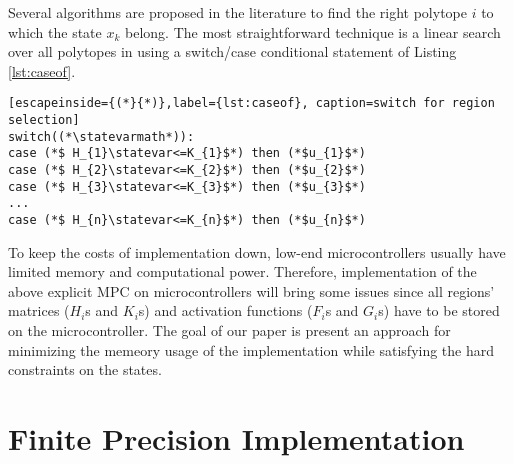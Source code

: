 Several algorithms are proposed in the literature \Sadegh{[references?]} to find the right polytope $i$ to which the state $x_k$ belong. The most straightforward technique is a linear search over all polytopes in \Sadegh{\statespace\space} using a switch/case conditional statement of Listing \ref{lst:caseof}.

\begin{lstlisting}[escapeinside={(*}{*)},label={lst:caseof}, caption=switch for region selection]
switch((*\statevarmath*)):
case (*$ H_{1}\statevar<=K_{1}$*) then (*$u_{1}$*)
case (*$ H_{2}\statevar<=K_{2}$*) then (*$u_{2}$*)
case (*$ H_{3}\statevar<=K_{3}$*) then (*$u_{3}$*)
...
case (*$ H_{n}\statevar<=K_{n}$*) then (*$u_{n}$*)
\end{lstlisting}

To keep the costs of implementation down, low-end microcontrollers usually have limited memory and computational power. Therefore, implementation of the above explicit MPC on microcontrollers will bring some issues since all regions' matrices ($H_i$s and $K_i$s) and activation functions ($F_i$s and $G_i$s) have to be stored on the microcontroller. The goal of our paper is present an approach for minimizing the memeory usage of the implementation while satisfying the hard constraints on the states. 

\section{Finite Precision Implementation}
